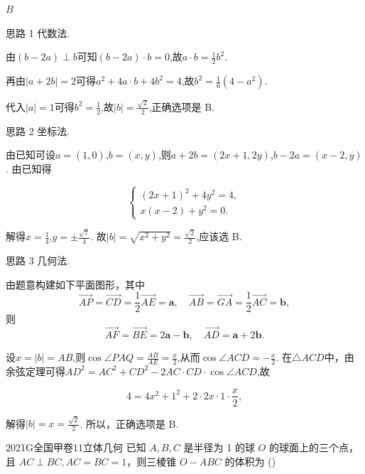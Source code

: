 \documentclass[12pt,UTF-8,a4paper]{ctexart}
\numberwithin{figure}{section}
\theoremstyle{mystyle}
\theoremstyle{mystylekaishu}
\theoremstyle{mystyle}
\numberwithin{xiti}{section}
\begin{document}
\begin{answer}
$B$
\end{answer}

\begin{solutions}
思路 1 代数法.

由$(b-2a) \perp b$可知$(b-2a) \cdot b=0$,故$a \cdot b=\frac{1}{2}b^2$.

再由$|a+2b|=2$可得$a^2+4a \cdot b+4b^2=4$,故$b^2=\frac{1}{6}(4-a^2)$.

代入$|a|=1$可得$b^2=\frac{1}{2}$,故$|b|=\frac{\sqrt{2}}{2}$,正确选项是 B.

思路 2 坐标法.

由已知可设$a=(1,0)$,$b=(x,y)$,则$a+2b=(2x+1,2y)$,$b-2a=(x-2,y)$. 由已知得

$$
\begin{cases} (2x+1)^2+4y^2=4, \\ x(x-2)+y^2=0. \end{cases}
$$

解得$x=\frac{1}{4}$,$y=\pm\frac{\sqrt{7}}{4}$. 故$|b|=\sqrt{x^2+y^2}=\frac{\sqrt{2}}{2}$,应该选 B.

思路 3 几何法.

由题意构建如下平面图形，其中
\[
\overrightarrow{AP}=\overrightarrow{CD}=\frac{1}{2}\overrightarrow{AE}=\boldsymbol{a},\quad
\overrightarrow{AB}=\overrightarrow{GA}=\frac{1}{2}\overrightarrow{AC}=\boldsymbol{b},
\]
则
\[
\overrightarrow{AF}=\overrightarrow{BE}=2\boldsymbol{a}-\boldsymbol{b},\quad
\overrightarrow{AD}=\boldsymbol{a}+2\boldsymbol{b}.
\]

设$x=|b|=AB$,则$\cos \angle PAQ=\frac{AB}{AE}=\frac{x}{2}$,从而$\cos \angle ACD=-\frac{x}{2}$. 在$\triangle ACD$中，由余弦定理可得$AD^2=AC^2+CD^2-2AC \cdot CD \cdot \cos \angle ACD$,故

$$
4=4x^2+1^2+2 \cdot 2x \cdot 1 \cdot \frac{x}{2},
$$

解得$|b|=x=\frac{\sqrt{2}}{2}$. 所以，正确选项是 B.
\end{solutions}


\begin{problem}{2021}{G}{全国甲卷}{11}{立体几何}
已知 $A, B, C$ 是半径为 1 的球 $O$ 的球面上的三个点，且 $AC \perp BC, AC=BC=1$，则三棱锥 $O-ABC$ 的体积为 (\hspace{1cm})
\begin{choices}
\end{choices}
\end{problem}
\end{document}
